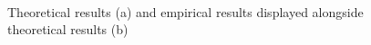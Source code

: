 \documentclass[]{assignment}
\begin{document}
\begin{figure}[h]
\centering
\fboxsep 0mm
\parbox{6cm}{\\}
~~~
\parbox{6cm}{\\}
\caption{\label{fig:imgfilter1} Theoretical results (a) and empirical results displayed alongside theoretical results (b)}
\end{figure} 
\label{last_page}





 
\end{document}
